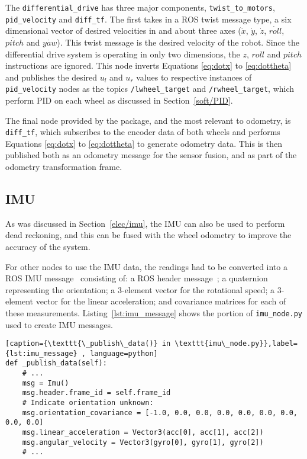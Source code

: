 The \verb|differential_drive| has three major components, \verb|twist_to_motors|, \verb|pid_velocity| and \verb|diff_tf|. The first takes in a ROS twist message type, a six dimensional vector of desired velocities in and about three axes ($\dot{x}$, $\dot{y}$, $\dot{z}$, $\dot{roll}$, $\dot{pitch}$ and $\dot{yaw}$). This twist message is the desired velocity of the robot. Since the differential drive system is operating in only two dimensions, the $z$, $roll$ and $pitch$ instructions are ignored. This node inverts Equations \ref{eq:dotx} to \ref{eq:dottheta} and publishes the desired $u_l$ and $u_r$ values to respective instances of \verb|pid_velocity| nodes as the topics \verb|/lwheel_target| and  \verb|/rwheel_target|, which perform PID on each wheel as discussed in Section~\ref{soft/PID}.

The final node provided by the package, and the most relevant to odometry, is \verb|diff_tf|, which subscribes to the encoder data of both wheels and performs Equations \ref{eq:dotx} to \ref{eq:dottheta} to generate odometry data. This is then published both as an odometry message for the sensor fusion, and as part of the odometry transformation frame.

\subsection{IMU}\label{soft/odometry/imu}

As was discussed in Section~\ref{elec/imu}, the IMU can also be used to
perform dead reckoning, and this can be fused with the wheel odometry to
improve the accuracy of the system.

For other nodes to use the IMU data, the readings had to be converted into
a ROS IMU message~\cite[sensor\_msgs/Imu.msg]{ROSDocs} consisting of: a ROS header message~\cite[std\_msgs/Header.msg]{ROSDocs};
a quaternion representing the orientation; a 3-element vector for
the rotational speed; a 3-element vector for the linear
acceleration; and covariance matrices for each of these measurements.
Listing~\ref{lst:imu_message} shows the portion of \verb|imu_node.py| used to create IMU messages.


\begin{lstlisting}[caption={\texttt{\_publish\_data()} in \texttt{imu\_node.py}},label={lst:imu_message} , language=python]
def _publish_data(self):
    # ...
    msg = Imu()
    msg.header.frame_id = self.frame_id
    # Indicate orientation unknown:
    msg.orientation_covariance = [-1.0, 0.0, 0.0, 0.0, 0.0, 0.0, 0.0, 0.0, 0.0]
    msg.linear_acceleration = Vector3(acc[0], acc[1], acc[2])
    msg.angular_velocity = Vector3(gyro[0], gyro[1], gyro[2])
    # ...
\end{lstlisting}

